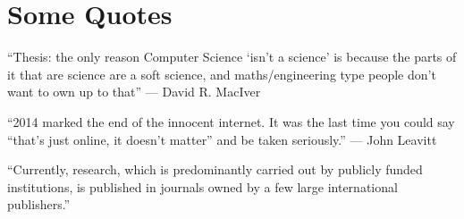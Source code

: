 \section{Some Quotes}

\enquote{Thesis: the only reason Computer Science \enquote{isn't a science} is because the parts of it that are science are a soft science, and maths/engineering type people don't want to own up to that}
--- David R. MacIver \parencite*{maciverThesisOnlyReason2018}

\enquote{2014 marked the end of the innocent internet. It was the last time you could say “that’s just online, it doesn’t matter” and be taken seriously.}
--- John Leavitt \parencite*{leavittInnocentInternetDied2019}

\enquote{Currently, research, which is predominantly carried out by publicly funded institutions, is published in journals owned by a few large international publishers.}
\parencite{lundEuropeanEffortPromote2018}

\printbibliography[notkeyword=Tweet]
\printbibliography[keyword=Tweet,title={Referenced Tweets}]



